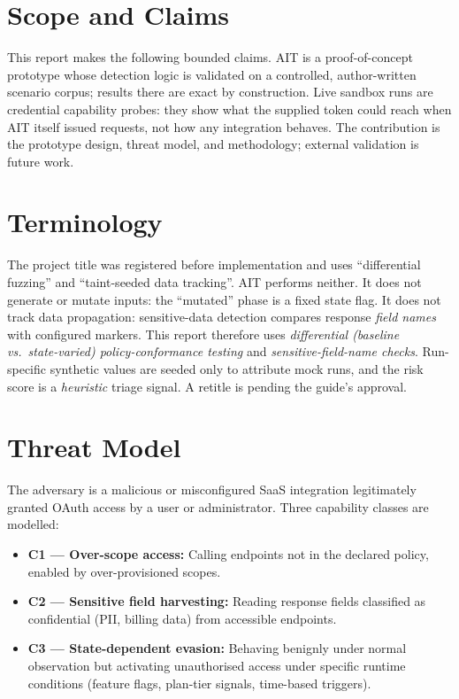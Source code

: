 \documentclass[12pt,a4paper]{report}
\begin{document}
\section{Scope and Claims}

This report makes the following bounded claims. AIT is a proof-of-concept prototype whose
detection logic is validated on a controlled, author-written scenario corpus; results there are
exact by construction. Live sandbox runs are credential capability probes: they show what the
supplied token could reach when AIT itself issued requests, not how any integration behaves. The
contribution is the prototype design, threat model, and methodology; external validation is
future work.

\section{Terminology}
\label{sec:terms}

The project title was registered before implementation and uses ``differential fuzzing'' and
``taint-seeded data tracking''. AIT performs neither. It does not generate or mutate inputs: the
``mutated'' phase is a fixed state flag. It does not track data propagation: sensitive-data
detection compares response \emph{field names} with configured markers. This report therefore
uses \emph{differential (baseline vs.\ state-varied) policy-conformance testing} and
\emph{sensitive-field-name checks}. Run-specific synthetic values are seeded only to attribute
mock runs, and the risk score is a \emph{heuristic} triage signal. A retitle is pending the
guide's approval.

\section{Threat Model}

The adversary is a malicious or misconfigured SaaS integration legitimately granted OAuth
access by a user or administrator. Three capability classes are modelled:

\begin{itemize}
    \item \textbf{C1 --- Over-scope access:} Calling endpoints not in the declared policy, enabled by over-provisioned scopes.
    \item \textbf{C2 --- Sensitive field harvesting:} Reading response fields classified as confidential (PII, billing data) from accessible endpoints.
    \item \textbf{C3 --- State-dependent evasion:} Behaving benignly under normal observation but activating unauthorised access under specific runtime conditions (feature flags, plan-tier signals, time-based triggers).
\end{itemize}
\end{document}
